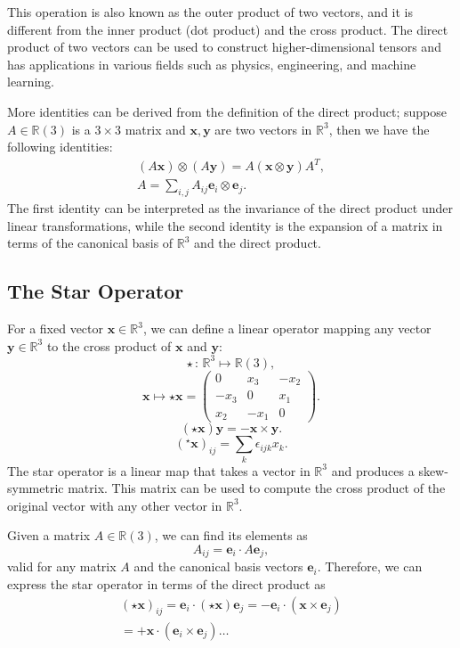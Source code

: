 This operation is also known as the outer product of two vectors, and it is different from the inner product (dot product) and the cross product. The direct product of two vectors can be used to construct higher-dimensional tensors and has applications in various fields such as physics, engineering, and machine learning.

More identities can be derived from the definition of the direct product; suppose \(A \in \mathbb{R}(3)\) is a \(3 \times 3\) matrix and \(\mathbf{x}, \mathbf{y}\) are two vectors in \(\mathbb{R}^3\), then we have the following identities:
\[
    \begin{aligned}
        (A \mathbf{x}) \otimes (A \mathbf{y}) = A (\mathbf{x} \otimes \mathbf{y}) A^T, \\
        A = \sum_{i, j} A_{ij} \mathbf{e}_i \otimes \mathbf{e}_j.
    \end{aligned}
\]
The first identity can be interpreted as the invariance of the direct product under linear transformations, while the second identity is the expansion of a matrix in terms of the canonical basis of \(\mathbb{R}^3\) and the direct product.

\subsection{The Star Operator}

For a fixed vector \(\mathbf{x} \in \mathbb{R}^3\), we can define a linear operator mapping any vector \(\mathbf{y} \in \mathbb{R}^3\) to the cross product of \(\mathbf{x}\) and \(\mathbf{y}\):
\[
    \star \, : \, \mathbb{R}^3 \mapsto \mathbb{R}(3),
\]
\[
    \mathbf{x} \mapsto \star \mathbf{x} = \begin{pmatrix}
        0    & x_3  & -x_2 \\
        -x_3 & 0    & x_1  \\
        x_2  & -x_1 & 0
    \end{pmatrix}.
\]
\[
    (\star \mathbf{x}) \mathbf{y} = - \mathbf{x} \times \mathbf{y}.
\]
\[
    (^{\star} \mathbf{x})_{ij} = \sum_{k} \epsilon_{ijk} x_k.
\]
The star operator is a linear map that takes a vector in \(\mathbb{R}^3\) and produces a skew-symmetric matrix. This matrix can be used to compute the cross product of the original vector with any other vector in \(\mathbb{R}^3\).

Given a matrix \(A \in \mathbb{R}(3)\), we can find its elements as
\[
    A_{ij} = \mathbf{e}_i \cdot A \mathbf{e}_j,
\]
valid for any matrix \(A\) and the canonical basis vectors \(\mathbf{e}_i\). Therefore, we can express the star operator in terms of the direct product as
\[
    \begin{aligned}
        (\star \mathbf{x})_{ij} = \mathbf{e}_i \cdot (\star \mathbf{x}) \mathbf{e}_j = - \mathbf{e}_i \cdot (\mathbf{x} \times \mathbf{e}_j) \\
        = + \mathbf{x} \cdot (\mathbf{e}_i \times \mathbf{e}_j) \dots
    \end{aligned}
\]

